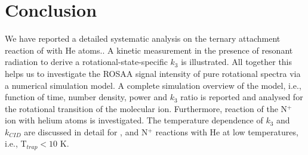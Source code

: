 \section{Conclusion}
\label{sec:CD+_conclusion}

We have reported a detailed systematic analysis on the ternary attachment reaction of \CD with He atoms.. A kinetic measurement in the presence of resonant radiation to derive a rotational-state-specific $k_3$ is illustrated. All together this helps us to investigate the ROSAA signal intensity of pure rotational spectra via a numerical simulation model. 
A complete simulation overview of the model, i.e., function of time, number density, power and $k_3$ ratio is reported and analysed for the \CDline rotational transition of the \CD molecular ion. Furthermore, reaction of the N$^+$ ion with helium atoms is investigated. The temperature dependence of $k_3$ and $k_{CID}$ are discussed in detail for \CD, and N$^+$ reactions with He at low temperatures, i.e., T$_{trap}<10$ K.
